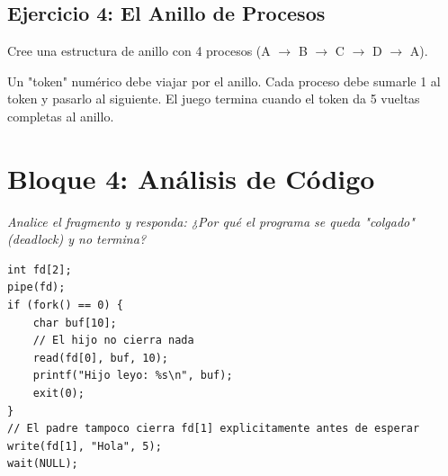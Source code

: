 \documentclass[12pt,a4paper]{article}
\begin{document}
\subsection*{Ejercicio 4: El Anillo de Procesos}
Cree una estructura de anillo con 4 procesos (A $\rightarrow$ B $\rightarrow$ C $\rightarrow$ D $\rightarrow$ A).
\begin{center}
\end{center}
Un "token" numérico debe viajar por el anillo. Cada proceso debe sumarle 1 al token y pasarlo al siguiente. El juego termina cuando el token da 5 vueltas completas al anillo.

\section*{Bloque 4: Análisis de Código}
\textit{Analice el fragmento y responda: ¿Por qué el programa se queda "colgado" (deadlock) y no termina?}

\begin{lstlisting}
int fd[2];
pipe(fd);
if (fork() == 0) {
    char buf[10];
    // El hijo no cierra nada
    read(fd[0], buf, 10);
    printf("Hijo leyo: %s\n", buf);
    exit(0);
}
// El padre tampoco cierra fd[1] explicitamente antes de esperar
write(fd[1], "Hola", 5);
wait(NULL);
\end{lstlisting}
\end{document}
